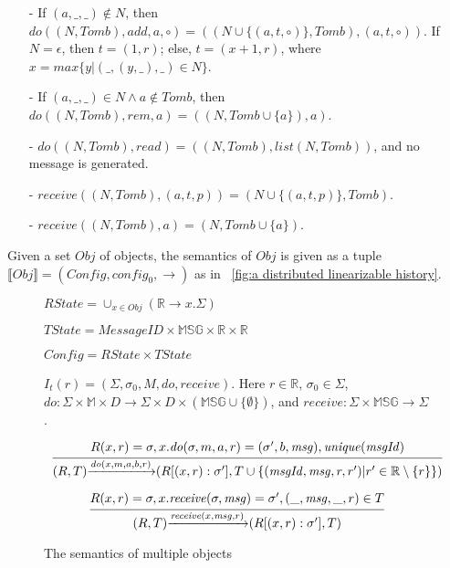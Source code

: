 \begin{example}[RGA]
\begin{itemize}
\item[-] If $(a,\_,\_) \notin N$, then $\mathit{do}((N,\mathit{Tomb}),\mathit{add},a,\circ) = ((N \cup \{ (a,t,\circ) \},\mathit{Tomb}),(a,t,\circ))$. If $N = \epsilon$, then $t = (1,r)$; else, $t = (x+1,r)$, where $x = \mathit{max}\{ y \vert (\_,(y,\_),\_) \in N \}$.

\item[-] If $(a,\_,\_) \in N \wedge a \notin \mathit{Tomb}$, then $\mathit{do}((N,\mathit{Tomb}),\mathit{rem},a) = ((N,\mathit{Tomb} \cup \{ a \} ),a)$.

\item[-] $\mathit{do}((N,\mathit{Tomb}),\mathit{read}) = ((N,\mathit{Tomb}),\mathit{list}(N,\mathit{Tomb}))$, and no message is generated.

\item[-] $\mathit{receive}((N,\mathit{Tomb}),(a,t,p)) = (N \cup \{ (a,t,p) \},\mathit{Tomb})$.

\item[-] $\mathit{receive}((N,\mathit{Tomb}),a) = (N,\mathit{Tomb} \cup \{ a \})$.
\end{itemize}
\end{example}

 Given a set $\mathit{Obj}$ of objects, the semantics of $\mathit{Obj}$ is given as a tuple $\llbracket \mathit{Obj} \rrbracket = (\mathit{Config},\mathit{config}_0,\rightarrow)$ as in \figurename~\ref{fig:a distributed linearizable history}.

\begin{figure}[ht]
$\mathit{RState} = \cup_{x \in \mathit{Obj}} (\mathbb{R} \rightarrow x.\Sigma)$

$\mathit{TState} = \mathit{MessageID} \times \mathbb{MSG} \times \mathbb{R} \times \mathbb{R}$

$\mathit{Config} = \mathit{RState} \times \mathit{TState}$

$I_t(r) = (\Sigma, \sigma_0, M, \mathit{do},\mathit{receive})$. Here $r \in \mathbb{R}$, $\sigma_0 \in \Sigma$, $\mathit{do}:\Sigma \times \mathbb{M} \times D \rightarrow \Sigma \times D \times (\mathbb{MSG} \cup \{ \emptyset \} )$, and $\mathit{receive}: \Sigma \times \mathbb{MSG} \rightarrow \Sigma$.

\[
\begin{array}{l c}
\bigfrac{ R(x,r) = \sigma, x.\mathit{do}(\sigma,m,a,r) = (\sigma',b,\mathit{msg}), \mathit{unique}(\mathit{msgId}) }
{ (R,T) {\xrightarrow{\mathit{do}(x,m,a,b,r)}} (R[(x,r):\sigma'],T \cup \{ (\mathit{msgId},\mathit{msg},r,r') \vert r' \in \mathbb{R} \setminus \{ r \} \}) }
\end{array}
\]

\[
\begin{array}{l c}
\bigfrac{ R(x,r) = \sigma, x.\mathit{receive}(\sigma,\mathit{msg}) = \sigma',(\_,\mathit{msg},\_,r) \in T}
{ (R,T) {\xrightarrow{\mathit{receive}(x,\mathit{msg},r)}} (R[(x,r):\sigma'],T) }
\end{array}
\]
\caption{The semantics of multiple objects}
\label{fig:the semantics of multiple objects}
\end{figure}

